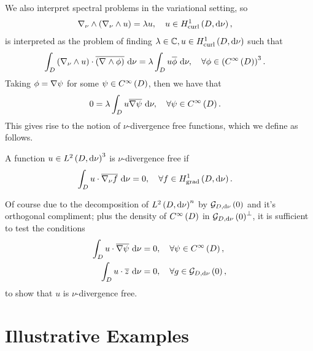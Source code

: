 We also interpret spectral problems in the variational setting, so 
\begin{align*}
	\nabla_{\nu}\wedge\left( \nabla_{\nu}\wedge u \right) &= \lambda u, \quad u\in H^1_\mathrm{curl}\left( D, \mathrm{d}\nu \right),
\end{align*}
is interpreted as the problem of finding $\lambda\in\mathbb{C}, u\in H^1_\mathrm{curl}\left( D, \mathrm{d}\nu \right)$ such that
\begin{align*}
	\int_{D} \left( \nabla_{\nu}\wedge u \right)\cdot\overline{\left( \nabla_{}\wedge\phi \right)}  \ \mathrm{d}\nu &= \lambda \int_{D} u\overline{\phi}  \ \mathrm{d}\nu, \quad \forall\phi\in\left( C^{\infty}\left( D \right) \right)^3.
\end{align*}
Taking $\phi = \nabla\psi$ for some $\psi\in C^{\infty}\left( D \right)$, then we have that
\begin{align*}
	0 &= \lambda \int_{D} u\overline{\nabla\psi} \ \mathrm{d}\nu, \quad \forall \psi\in C^{\infty}\left( D \right).
\end{align*}
This gives rise to the notion of $\nu$-divergence free functions, which we define as follows.
\begin{definition}
	A function $u\in L^{2}\left( D,\mathrm{d}\nu \right)^3$ is $\nu$-divergence free if
	\begin{align*}
		\int_{D} u\cdot\overline{\nabla_{\nu}f}  \ \mathrm{d}\nu &= 0, \quad \forall f\in H^1_\mathrm{grad}\left( D, \mathrm{d}\nu \right).
	\end{align*}	 
\end{definition}
Of course due to the decomposition of $L^{2}\left( D,\mathrm{d}\nu \right)^n$ by $\mathcal{G}_{ D, \mathrm{d}\nu}\left( 0 \right)$ and it's orthogonal compliment; plus the density of $C^{\infty}\left( D \right)$ in $\mathcal{G}_{ D, \mathrm{d}\nu}\left( 0 \right)^{\perp}$, it is sufficient to test the conditions
\begin{align*}
	\int_{D} u\cdot\overline{\nabla\psi}  \ \mathrm{d}\nu &= 0, \quad \forall \psi\in C^{\infty}\left( D \right), \\
	\int_{D} u\cdot\overline{z}  \ \mathrm{d}\nu &= 0, \quad \forall g\in\mathcal{G}_{ D, \mathrm{d}\nu}\left( 0 \right),
\end{align*}
to show that $u$ is $\nu$-divergence free.


\section{Illustrative Examples} \label{sec:CurlExamples}

